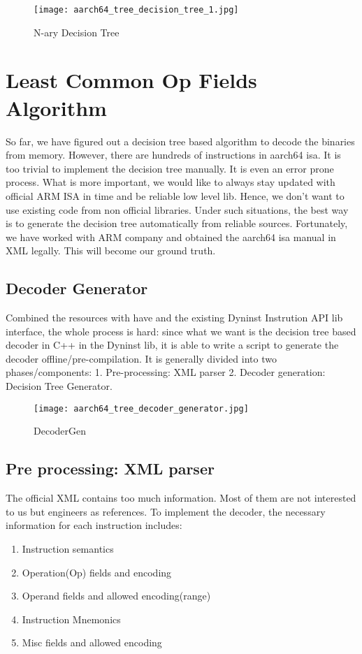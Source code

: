\documentclass[]{article}
\begin{document}
\begin{figure}[h]
	\texttt{[image: aarch64\_tree\_decision\_tree\_1.jpg]}
	\caption{N-ary Decision Tree}
	\label{fig:ndecisiontree}
\end{figure}

\section{Least Common Op Fields Algorithm}
So far, we have figured out a decision tree based algorithm to decode the binaries from memory. However, there are hundreds of instructions in aarch64 isa. It is too trivial to implement the decision tree manually. It is even an error prone process. What is 
more important, we would like to always stay updated with official ARM ISA in time and be reliable low level lib. Hence, we don't want to use existing code from non official libraries. Under such situations, the best way is to generate the decision tree automatically from reliable sources. Fortunately, we have worked with ARM company and obtained the aarch64 isa manual in XML legally. This will 
become our ground truth.

\subsection{Decoder Generator}
Combined the resources with have and the existing Dyninst Instrution API lib interface, the whole process is hard: since what we want is the decision tree based decoder in C++ in the Dyninst lib, it is able to write a script to generate the decoder offline/pre-compilation.
It is generally divided into two phases/components: 1. Pre-processing: XML parser 2. Decoder generation: Decision Tree Generator.

\begin{figure}[h]
	\texttt{[image: aarch64\_tree\_decoder\_generator.jpg]}
	\caption{DecoderGen}
	\label{fig:decodergen}
\end{figure}

\subsection{Pre processing: XML parser}
The official XML contains too much information. Most of them are not interested to us but engineers as references. To implement the decoder, the necessary information for each instruction includes:
\begin{enumerate}
	\item Instruction semantics
	\item Operation(Op) fields and encoding
	\item Operand fields and allowed encoding(range)
	\item Instruction Mnemonics
	\item Misc fields and allowed encoding
\end{enumerate}
\end{document}
